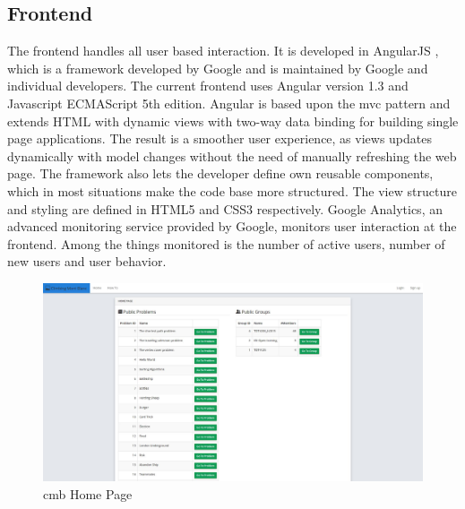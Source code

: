 \subsection{Frontend}
\label{subsec:cmb-arch-frontend}
The frontend handles all user based interaction. It is developed in AngularJS \cite{ANGULARJS}, which is a framework developed by Google and is maintained by Google and individual developers. The current frontend uses Angular version 1.3 and Javascript ECMAScript 5th edition. Angular is based upon the \gls{mvc} pattern \cite{b:mvc} and extends HTML with dynamic views with two-way data binding for building single page applications. The result is a smoother user experience, as views updates dynamically with model changes without the need of manually refreshing the web page. The framework also lets the developer define own reusable components, which in most situations make the code base more structured. The view structure and styling are defined in HTML5 and CSS3 respectively. Google Analytics, an advanced monitoring service provided by Google, monitors user interaction at the frontend. Among the things monitored is the number of active users, number of new users and user behavior. \\

\begin{figure}
    \centering
    \includegraphics[width=1\textwidth]{figs/front_page.jpg}
    \caption{\gls{cmb} Home Page}
    \label{fig:front-page}
\end{figure}


